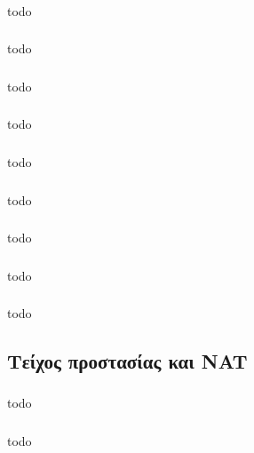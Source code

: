 \documentclass[a4paper, 12pt]{article}
\begin{document}
		\subsubsection{}
			todo

		\subsubsection{}
			todo

		\subsubsection{}
			todo

		\subsubsection{}
			todo

		\subsubsection{}
			todo

		\subsubsection{}
			todo

		\subsubsection{}
			todo

		\subsubsection{}
			todo

		\subsubsection{}
			todo

	\subsection{Τείχος προστασίας και NAT}

		\subsubsection{}
			todo

		\subsubsection{}
			todo
\end{document}
